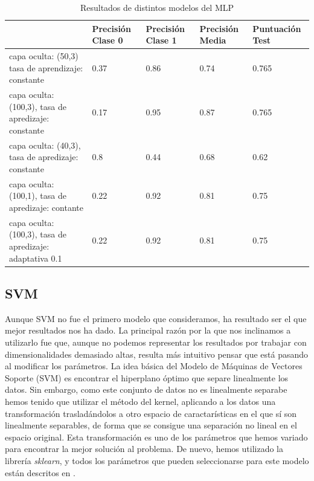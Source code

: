 \documentclass[journal,twoside]{JoPhA}
\begin{document}
\begin{table}[htb!]
	\begin{center}
		\caption{Resultados de distintos modelos del MLP}
		\begin{tabular}{| p{2.1cm} | p{1cm} | p{1cm} | p{1cm} | p{1.2cm} |}
			\hline
			& Precisión Clase 0 & Precisión Clase 1 & Precisión Media & Puntuación Test   \\ \hline
			capa oculta: (50,3) tasa de aprendizaje: constante & 0.37                & 0.86                & 0.74              & 0.765  \\ \hline
			capa oculta: (100,3), tasa de apredizaje: constante & 0.17                & 0.95               & 0.87             & 0.765  \\ \hline
			capa oculta: (40,3), tasa de apredizaje: constante & 0.8 & 0.44 & 0.68 & 0.62 \\ \hline
			capa oculta: (100,1), tasa de apredizaje: contante & 0.22 & 0.92 & 0.81 & 0.75	\\ \hline
			capa oculta: (100,3), tasa de apredizaje: adaptativa 0.1 & 0.22 & 0.92 & 0.81 & 0.75 \\ \hline
			
		\end{tabular}
		
		\label{tabla:tabla_mlp}
	\end{center}
\end{table}


\subsection{SVM}
	
	Aunque SVM no fue el primero modelo que consideramos, ha resultado ser el que mejor resultados nos ha dado. La principal razón por la que nos inclinamos a utilizarlo fue que, aunque no podemos representar los resultados por trabajar con dimensionalidades demasiado altas, resulta más intuitivo pensar que está pasando al modificar los parámetros. La idea básica del Modelo de Máquinas de Vectores Soporte (SVM) es encontrar el hiperplano óptimo que separe linealmente los datos. Sin embargo, como este conjunto de datos no es linealmente separabe hemos tenido que utilizar el método del kernel, aplicando a los datos una transformación trasladándolos a otro espacio de caractarísticas en el que sí son linealmente separables, de forma que se consigue una separación no lineal en el espacio original. Esta transformación es uno de los parámetros que hemos variado para encontrar la mejor solución al problema. De nuevo, hemos utilizado la librería \textit{sklearn}, y todos los parámetros que pueden seleccionarse para este modelo están descritos en \cite{svm}. \\
	
\end{document}
